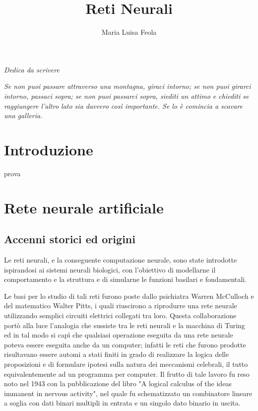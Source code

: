 \documentclass[12pt,a4paper,oneside]{book}
\author{Maria Luisa Feola}
\title{Reti Neurali}
\newcommand\AlCentroPagina[1]{%
\AddToShipoutPicture*{\AtPageCenter{%
\makebox(0,0){\includegraphics%
[width=0.9\paperwidth]{#1}}}}}
\begin{document}
	\AlCentroPagina{Immagini/Frontespizio}\thispagestyle{empty}
	
	\begin{flushright} 
		\newpage
		\null{}
		\thispagestyle{empty}
		\textit{Dedica da scrivere}
		\null
	\end{flushright} 
   	\begin{flushright} 
   		\newpage
   		\null\vspace{\stretch{1}}
   		\thispagestyle{empty}
   		\textit{Se non puoi passare attraverso una montagna, giraci intorno; se non puoi girarci intorno, passaci sopra; se non puoi passarci sopra, siediti un attimo e chiediti se raggiungere l'altro lato sia davvero così importante. Se lo è comincia a scavare una galleria.}
   		\null
   	\end{flushright} 
   
	\tableofcontents
	
	\chapter*{Introduzione}
	prova
		
	\chapter{Rete neurale artificiale}
		\section{Accenni storici ed origini}
		
		Le reti neurali, e la conseguente computazione neurale, sono state introdotte ispirandosi ai sistemi neurali biologici, con l'obiettivo di modellarne il comportamento e la struttura e di simularne le funzioni basilari e fondamentali.
		
	    Le basi per lo studio di tali reti furono poste dallo psichiatra Warren McCulloch e del matematico Walter Pitts, i quali riuscirono a riprodurre una rete neurale utilizzando semplici circuiti elettrici collegati tra loro. Questa collaborazione portò alla luce l'analogia che sussiste tra le reti neurali e la macchina di Turing ed in tal modo si capì che qualsiasi operazione eseguita da una rete neurale poteva essere eseguita anche da un computer; infatti le reti che furono prodotte risultavano essere automi a stati finiti in grado di realizzare la logica delle proposizioni e di formulare ipotesi sulla natura dei meccanismi celebrali, il tutto equivalentemente ad un programma per computer.
	    Il frutto di tale lavoro fu reso noto nel 1943 con la pubblicazione del libro "A logical calculus of the ideas immanent in nervous activity", nel quale fu schematizzato un combinatore lineare a soglia con dati binari multipli in entrata e un singolo dato binario in uscita.
	    
\end{document}
